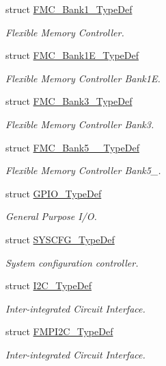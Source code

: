 \begin{DoxyCompactItemize}
struct \hyperlink{struct_f_m_c___bank1___type_def}{F\+M\+C\+\_\+\+Bank1\+\_\+\+Type\+Def}
\begin{DoxyCompactList}\small\item\em Flexible Memory Controller. \end{DoxyCompactList}\item 
struct \hyperlink{struct_f_m_c___bank1_e___type_def}{F\+M\+C\+\_\+\+Bank1\+E\+\_\+\+Type\+Def}
\begin{DoxyCompactList}\small\item\em Flexible Memory Controller Bank1E. \end{DoxyCompactList}\item 
struct \hyperlink{struct_f_m_c___bank3___type_def}{F\+M\+C\+\_\+\+Bank3\+\_\+\+Type\+Def}
\begin{DoxyCompactList}\small\item\em Flexible Memory Controller Bank3. \end{DoxyCompactList}\item 
struct \hyperlink{struct_f_m_c___bank5__6___type_def}{F\+M\+C\+\_\+\+Bank5\+\_\+\_\+\+Type\+Def}
\begin{DoxyCompactList}\small\item\em Flexible Memory Controller Bank5\+\_. \end{DoxyCompactList}\item 
struct \hyperlink{struct_g_p_i_o___type_def}{G\+P\+I\+O\+\_\+\+Type\+Def}
\begin{DoxyCompactList}\small\item\em General Purpose I/O. \end{DoxyCompactList}\item 
struct \hyperlink{struct_s_y_s_c_f_g___type_def}{S\+Y\+S\+C\+F\+G\+\_\+\+Type\+Def}
\begin{DoxyCompactList}\small\item\em System configuration controller. \end{DoxyCompactList}\item 
struct \hyperlink{struct_i2_c___type_def}{I2\+C\+\_\+\+Type\+Def}
\begin{DoxyCompactList}\small\item\em Inter-\/integrated Circuit Interface. \end{DoxyCompactList}\item 
struct \hyperlink{struct_f_m_p_i2_c___type_def}{F\+M\+P\+I2\+C\+\_\+\+Type\+Def}
\begin{DoxyCompactList}\small\item\em Inter-\/integrated Circuit Interface. \end{DoxyCompactList}\item 

\end{DoxyCompactItemize}
